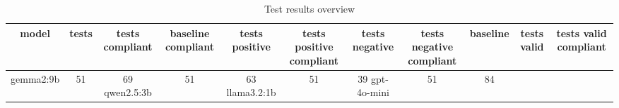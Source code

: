 
  \begin{table}[h!]
  \centering
  \begin{tabular}{|c|c|c|c|c|c|c|c|c|c|c|}
  \hline
  model & tests & tests compliant & baseline compliant & tests positive & tests positive compliant & tests negative & tests negative compliant & baseline & tests valid & tests valid compliant \\
  \hline
  gemma2:9b & 51 & 69%
\hline
qwen2.5:3b & 51 & 63%
\hline
llama3.2:1b & 51 & 39%
\hline
gpt-4o-mini & 51 & 84%
  \end{tabular}
  \caption{Test results overview}
  
  \end{table}
  